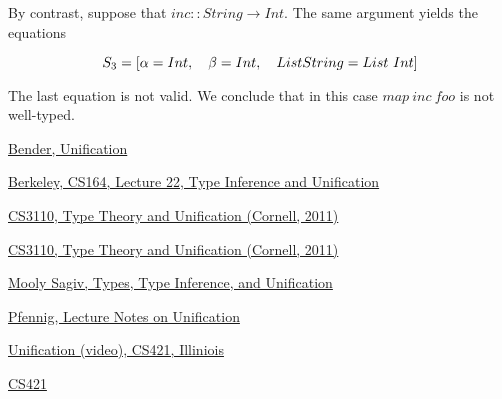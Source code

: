 By contrast, suppose that $inc ::  String \to Int$.  The same argument yields the equations

\begin{equation}
S_3 = [\alpha = Int, \quad \beta = Int, \quad List\space String = List\ Int]
\end{equation}

The last equation is not valid.  We conclude that in this case $map\ inc\ foo$ is not well-typed.

\bigskip



\bigskip

\begin{thebibliography}

 \href{https://www.cs.unh.edu/~ruml/cs730/unification.pdf}{Bender, Unification}

 \href{https://inst.eecs.berkeley.edu/~cs164/sp11/lectures/lecture22.pdf}{Berkeley, CS164, Lecture 22, Type Inference and Unification} $\quad$ 

 \href{https://www.cs.cornell.edu/courses/cs3110/2011sp/Lectures/lec26-type-inference/type-inference.htm}{CS3110, Type Theory and Unification (Cornell, 2011)} $\quad$ 

 \href{https://www.cs.cornell.edu/courses/cs6110/2017sp/lectures/lec23.pdf}{CS3110, Type Theory and Unification (Cornell, 2011)} 

 \href{http://www.cs.tau.ac.il/~msagiv/courses/pl16/types.pdf}{Mooly Sagiv, Types, Type Inference, and Unification} $\quad$ 

 \href{https://www.cs.cmu.edu/~fp/courses/15816-s12/lectures/19-unif.pdf}{Pfennig, Lecture Notes on Unification}

 \href{https://pages.github-dev.cs.illinois.edu/cs421-sp18/web/videos/unification/}{Unification (video), CS421, Illiniois}

 \href{https://pages.github-dev.cs.illinois.edu/cs421-sp18/web/pages/lectures/}{CS421}

\end{thebibliography}
